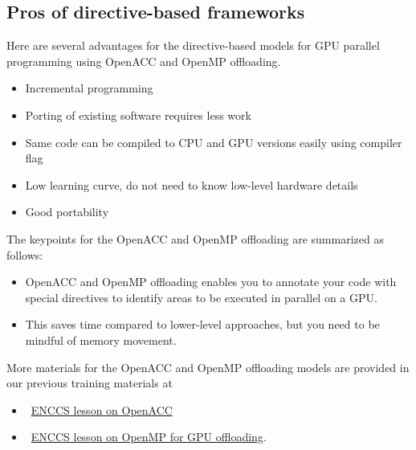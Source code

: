 \subsection{Pros of directive-based frameworks}


\par
Here are several advantages for the directive-based models for GPU parallel programming using OpenACC and OpenMP offloading.
\begin{itemize}
    \item Incremental programming
    \item Porting of existing software requires less work
    \item Same code can be compiled to CPU and GPU versions easily using compiler flag
    \item Low learning curve, do not need to know low-level hardware details
    \item Good portability
\end{itemize}


\par
The keypoints for the OpenACC and OpenMP offloading are summarized as follows:
\begin{itemize}
    \item OpenACC and OpenMP offloading enables you to annotate your code with special directives to identify areas to be executed in parallel on a GPU.
    \item This saves time compared to lower-level approaches, but you need to be mindful of memory movement.
\end{itemize}


\par
More materials for the OpenACC and OpenMP offloading models are provided in our previous training materials at
\begin{itemize}
    \item~\href{https://enccs.github.io/openacc/}{ENCCS lesson on OpenACC}
    \item~\href{https://enccs.github.io/openmp-gpu/}{ENCCS lesson on OpenMP for GPU offloading}.
\end{itemize}

